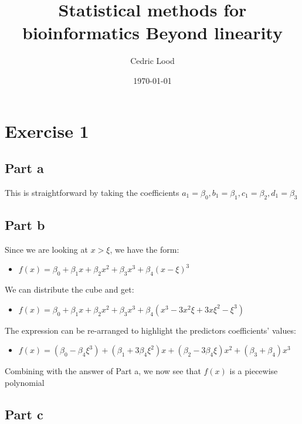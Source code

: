 \documentclass[11pt, a4paper]{article}
\title{Statistical methods for bioinformatics \linebreak Beyond linearity}
\author{Cedric Lood}
\date{\today}
\begin{document}
\maketitle


\graphicspath{ {figures/} }
\setlength{\droptitle}{-5em} 
\setlength{\parindent}{0cm}

\section{Exercise 1}
\label{sec-1}
\subsection{Part a}
\label{sec-1-1}

This is straightforward by taking the coefficients $a_1=\beta_0,
b_1=\beta_1, c_1=\beta_2, d_1=\beta_3$
\subsection{Part b}
\label{sec-1-2}

Since we are looking at $x>\xi$, we have the form:

\begin{itemize}
\item $f(x)=\beta_0 + \beta_1 x + \beta_2 x^2 + \beta_3 x^3 + \beta_4 (x - \xi)^3$
\end{itemize}

We can distribute the cube and get:

\begin{itemize}
\item $f(x)=\beta_0 + \beta_1 x + \beta_2 x^2 + \beta_3 x^3 + \beta_4 (x^3 - 3 x^2 \xi + 3 x \xi^2 - \xi^3)$
\end{itemize}

The expression can be re-arranged to highlight the predictors
coefficients' values:
 
\begin{itemize}
\item $f(x)=(\beta_0 - \beta_4 \xi^3) + (\beta_1 + 3 \beta_4 \xi^2) x +(\beta_2 - 3 \beta_4 \xi) x^2 + (\beta_3 + \beta_4) x^3$
\end{itemize}

Combining with the answer of Part a, we now see that $f(x)$ is a
piecewise polynomial
\subsection{Part c}
\label{sec-1-3}
\end{document}
